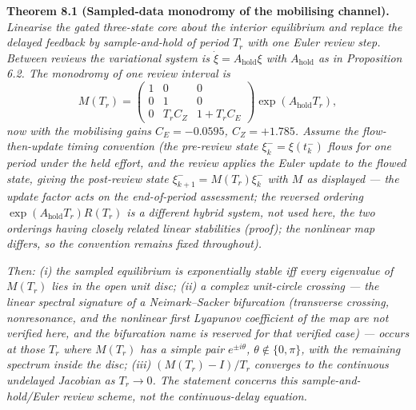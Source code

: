\documentclass[11pt]{article}
\begin{document}
\textbf{Theorem 8.1 (Sampled-data monodromy of the mobilising channel).}
\emph{Linearise the gated three-state core about the interior
equilibrium and replace the delayed feedback by sample-and-hold of
period \(T_r\) with one Euler review step. Between reviews the
variational system is \(\dot\xi = A_{\mathrm{hold}}\xi\) with
\(A_{\mathrm{hold}}\) as in Proposition 6.2. The monodromy of one review
interval is}
\[M(T_r) = \begin{pmatrix} 1 & 0 & 0 \\ 0 & 1 & 0 \\ 0 & T_r C_Z & 1 + T_r C_E \end{pmatrix} \exp(A_{\mathrm{hold}} T_r), \tag{12}\]
\emph{now with the mobilising gains \(C_E = -0.0595\), \(C_Z = +1.785\).
Assume the flow-then-update timing convention (the pre-review state
\(\xi_k^- = \xi(t_k^-)\) flows for one period under the held effort, and
the review applies the Euler update to the flowed state, giving the
post-review state \(\xi_{k+1}^- = M(T_r)\xi_k^-\) with \(M\) as
displayed --- the update factor acts on the end-of-period assessment;
the reversed ordering \(\exp(A_{\mathrm{hold}}T_r)R(T_r)\) is a
different hybrid system, not used here, the two orderings having closely
related linear stabilities (proof); the nonlinear map differs, so the
convention remains fixed throughout).}

\emph{Then: (i) the sampled equilibrium is exponentially stable iff
every eigenvalue of \(M(T_r)\) lies in the open unit disc; (ii) a
complex unit-circle crossing --- the linear spectral signature of a
Neimark--Sacker bifurcation (transverse crossing, nonresonance, and the
nonlinear first Lyapunov coefficient of the map are not verified here,
and the bifurcation name is reserved for that verified case) --- occurs
at those \(T_r\) where \(M(T_r)\) has a simple pair \(e^{\pm i\theta}\),
\(\theta \notin \{0, \pi\}\), with the remaining spectrum inside the
disc; (iii) \((M(T_r) - I)/T_r\) converges to the continuous undelayed
Jacobian as \(T_r \to 0\). The statement concerns this
sample-and-hold/Euler review scheme, not the continuous-delay equation.}
\end{document}
